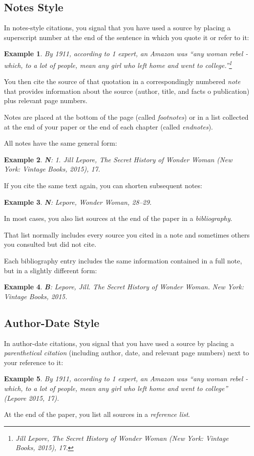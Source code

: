 \documentclass[oneside]{book}
\numberwithin{equation}{section}
\newtheorem{example}{Example}[section]
\begin{document}
\subsection{Notes Style}
In notes-style citations, you signal that you have used a source by placing a superscript number at the end of the sentence in which you quote it or refer to it:
\begin{example}
    By 1911, according to 1 expert, an Amazon was ``any woman rebel - which, to a lot of people, mean any girl who left home and went to college.''\footnote{Jill Lepore, \textit{The Secret History of Wonder Woman} (New York: Vintage Books, 2015), 17.}
\end{example}
You then cite the source of that quotation in a correspondingly numbered \textit{note} that provides information about the source (author, title, and facts o publication) plus relevant page numbers.

Notes are placed at the bottom of the page (called \textit{footnotes}) or in a list collected at the end of your paper or the end of each chapter (called \textit{endnotes}).

All notes have the same general form:
\begin{example}\rm
    \textbf{N}: 1. Jill Lepore, \textit{The Secret History of Wonder Woman} (New York: Vintage Books, 2015), 17.
\end{example}
If you cite the same text again, you can shorten subsequent notes:
\begin{example}\rm
    \textbf{N}: Lepore, \textit{Wonder Woman}, 28--29.
\end{example}
In most cases, you also list sources at the end of the paper in a \textit{bibliography}.

That list normally includes every source you cited in a note and sometimes others you consulted but did not cite.

Each bibliography entry includes the same information contained in a full note, but in a slightly different form:
\begin{example}\rm
    \textbf{B}: Lepore, Jill. \textit{The Secret History of Wonder Woman}. New York: Vintage Books, 2015.
\end{example}

\subsection{Author-Date Style}
In author-date citations, you signal that you have used a source by placing a \textit{parenthetical citation} (including author, date, and relevant page numbers) next to your reference to it:
\begin{example}
    By 1911, according to 1 expert, an Amazon was ``any woman rebel - which, to a lot of people, mean any girl who left home and went to college'' (Lepore 2015, 17).
\end{example}
At the end of the paper, you list all sources in a \textit{reference list}.
\end{document}
